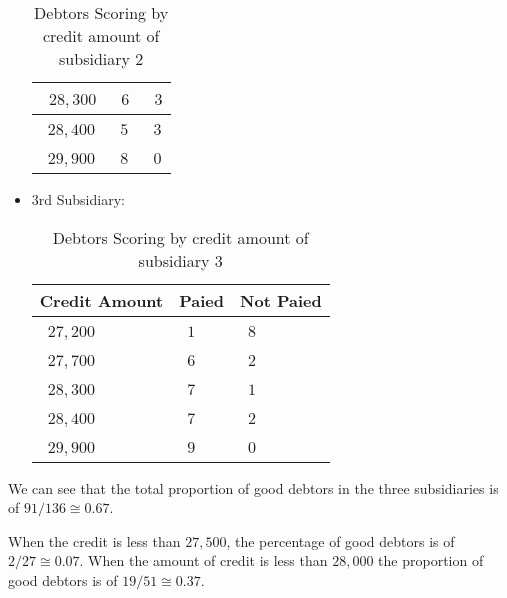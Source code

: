 \begin{itemize}
\begin{table}[H]
\begin{center}
\begin{tabular}{|p{2cm}|p{2cm}|p{2cm}|}
						\centering\arraybackslash\ $28,300$ & \centering\arraybackslash\ $6$ & \centering\arraybackslash\ $3$ \\ \hline
						\centering\arraybackslash\ $28,400$ & \centering\arraybackslash\ $5$ & \centering\arraybackslash\ $3$ \\ \hline
						\centering\arraybackslash\ $29,900$ & \centering\arraybackslash\ $8$ & \centering\arraybackslash\ $0$ \\ \hline
				\end{tabular}
			\end{center}
			\caption[]{Debtors Scoring by credit amount of subsidiary 2}
			\end{table}
		\item 3rd Subsidiary:
		\begin{table}[H]
			\begin{center}
				\definecolor{gris}{gray}{0.85}
				\begin{tabular}{|p{2cm}|p{2cm}|p{2cm}|}
						\hline
						\multicolumn{1}{c}{\cellcolor{black!30}\textbf{Credit Amount}} & 
		  \multicolumn{1}{c}{\cellcolor{black!30}\textbf{Paied}}  & \multicolumn{1}{c}{\cellcolor{black!30}\textbf{Not Paied}}\\ \hline
						\centering\arraybackslash\ $27,200$ & \centering\arraybackslash\ $1$ & \centering\arraybackslash\ $8$ \\ \hline
						\centering\arraybackslash\ $27,700$ & \centering\arraybackslash\ $6$ & \centering\arraybackslash\ $2$ \\ \hline
						\centering\arraybackslash\ $28,300$ & \centering\arraybackslash\ $7$ & \centering\arraybackslash\ $1$ \\ \hline
						\centering\arraybackslash\ $28,400$ & \centering\arraybackslash\ $7$ & \centering\arraybackslash\ $2$ \\ \hline
						\centering\arraybackslash\ $29,900$ & \centering\arraybackslash\ $9$ & \centering\arraybackslash\ $0$ \\ \hline
				\end{tabular}
			\end{center}
			\caption[]{Debtors Scoring by credit amount of subsidiary 3}
		\end{table}
	\end{itemize}
	We can see that the total proportion of good debtors in the three subsidiaries is of $91/136 \cong 0.67$.
	
	When the credit is less than $27,500$, the percentage of good debtors is of $2/27\cong 0.07$. When the amount of credit is less than $28,000$ the proportion of good debtors is of $19/51\cong 0.37$.
	
